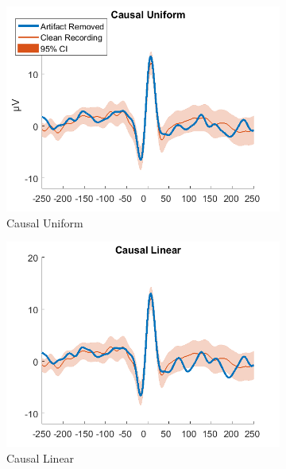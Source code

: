 \documentclass[a4paper]{article}
\begin{document}
\begin{figure}[hbtp]
    \begin{subfigure}{0.245\textwidth}
        \includegraphics[width=\textwidth]{./img/eva/ecg_td_Causal_Uniform.png}
        \caption{Causal Uniform}\label{fig:td_causaluniform}
    \end{subfigure}
    \begin{subfigure}{0.245\textwidth}
        \includegraphics[width=\textwidth]{./img/eva/ecg_td_Causal_Linear.png}
        \caption{Causal Linear}\label{fig:td_causallinear}
    \end{subfigure}
    \begin{subfigure}{0.245\textwidth}

\end{subfigure}
\end{figure}
\end{document}
